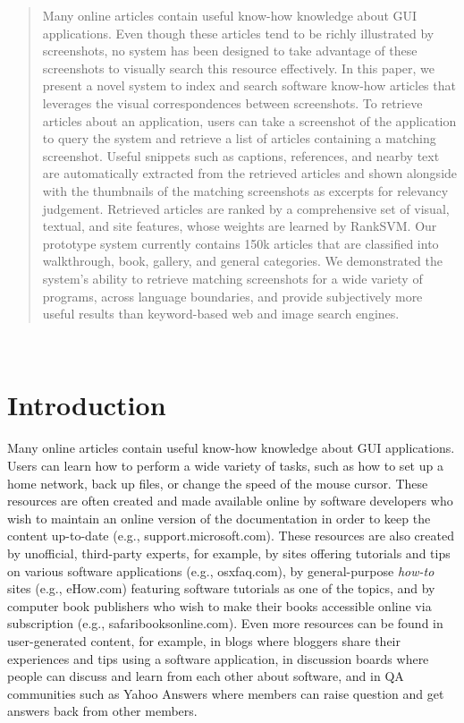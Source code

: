 \documentclass{www2010-submission}
\begin{document}
\begin{abstract}
  Many online articles contain useful know-how knowledge about GUI
  applications. Even though these articles tend to be richly
  illustrated by screenshots, no system has been designed to take
  advantage of these screenshots to visually search this resource
  effectively.  In this paper, we present a novel system to index and
  search software know-how articles that leverages the visual
  correspondences between screenshots. To retrieve articles about an
  application, users can take a screenshot of the application to query
  the system and retrieve a list of articles containing a matching
  screenshot.  Useful snippets such as captions, references, and
  nearby text are automatically extracted from the retrieved articles
  and shown alongside with the thumbnails of the matching screenshots
  as excerpts for relevancy judgement. Retrieved articles are ranked
  by a comprehensive set of visual, textual, and site features, whose
  weights are learned by RankSVM. Our prototype system currently
  contains 150k articles that are classified into walkthrough, book,
  gallery, and general categories. We demonstrated the system's
  ability to retrieve matching screenshots for a wide variety of
  programs, across language boundaries, and provide subjectively more
  useful results than keyword-based web and image search engines.
\end{abstract}

\\



\section{Introduction}

Many online articles contain useful know-how knowledge about GUI
applications. Users can learn how to perform a
wide variety of tasks, such as how to set up a home network, back up
files, or change the speed of the mouse cursor. These resources are
often created and made available online by software developers who
wish to maintain an online version of the documentation in order to keep the content up-to-date (e.g.,
support.microsoft.com). These resources are also created by
unofficial, third-party experts, for example, by sites offering
tutorials and tips on various software applications (e.g.,
osxfaq.com), by general-purpose \emph{how-to} sites (e.g., eHow.com)
featuring software tutorials as one of the topics, and by computer
book publishers who wish to make their books accessible online via
subscription (e.g., safaribooksonline.com). Even more resources can be
found in user-generated content, for example, in blogs where bloggers
share their experiences and tips using a software application, in
discussion boards where people can discuss and learn from each other
about software, and in QA communities such as Yahoo Answers where
members can raise question and get answers back from other members.
\end{document}
